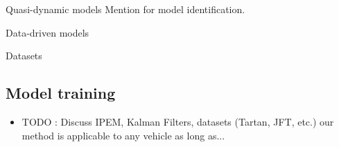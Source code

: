 Quasi-dynamic models
\citep{Seegmiller2014}
\citep{Ostafew2016}
\citep{Rabiee2019}
\citep{Takemura2021}
Mention \citep{Seegmiller2013} for model identification.

Data-driven models
\citep{Williams2018}
\citep{Nagariya2020}
\citep{Tremblay2021}

\lightlipsum[1-3]

Datasets
\citep{Triest2022}


\subsection{Model training}

\begin{itemize}
	\item TODO : Discuss IPEM, Kalman Filters, datasets (Tartan, JFT, etc.) our method is applicable to any vehicle as long as...
\end{itemize}

\lightlipsum[1-3]
